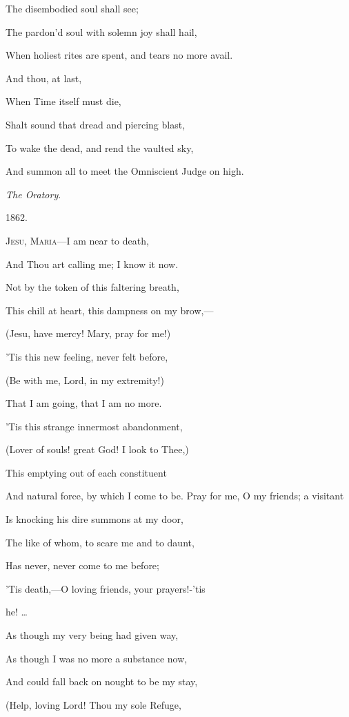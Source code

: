 The disembodied
soul shall see;

The pardon'd soul with solemn joy shall
hail,

When holiest rites are spent, and tears no more avail.

And thou, at last,

When Time itself must die,

Shalt sound that
dread and piercing blast,

To wake the dead, and rend the vaulted sky,

And summon all to meet the Omniscient Judge on high.

\emph{The Oratory}.

1862.



J\textsc{esu}, M\textsc{aria}—I am near to death,

And Thou art calling me; I know it now.

Not by the token of this faltering breath,

This chill at heart, this dampness on
my brow,—

(Jesu, have mercy! Mary, pray for me!)

'Tis this new feeling, never felt
before,

(Be with me, Lord, in my extremity!)

That I am going, that I am no more.

'Tis this strange innermost abandonment,

(Lover of souls! great God! I look to
Thee,)

This emptying out of each constituent

And natural force, by which I come to
be. Pray for me, O my friends; a visitant

Is knocking his dire summons at my
door,

The like of whom, to scare me and to daunt,

Has never, never come to me before;

'Tis death,—O loving friends, your prayers!-'tis

he! …

As though my very being had given way,

As though I was no more a substance
now,

And could fall back on nought to be my stay,

(Help, loving Lord! Thou my sole
Refuge,

